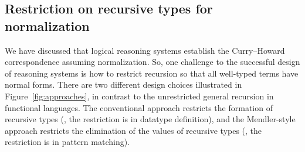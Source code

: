 
\subsection{Restriction on recursive types for normalization}
\label{sec:intro:concpets:recursive}
We have discussed that logical reasoning systems establish
the Curry--Howard correspondence assuming normalization.
So, one challenge to the successful design of reasoning systems
is how to restrict recursion so that all well-typed terms have normal forms.
There are two different design choices illustrated
in Figure~\ref{fig:approaches}, in contrast to
the unrestricted general recursion in functional languages.
The conventional approach restricts the formation of recursive types
(\ie, the restriction is in datatype definition), and
the Mendler-style approach restricts the elimination of the values of
recursive types (\ie, the restriction is in pattern matching).

